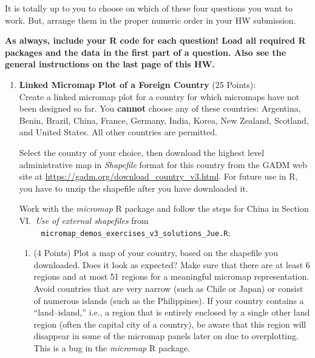 \documentclass[12pt,letterpaper,final]{article}
\begin{document}
It is totally up to you to choose on which of these four questions
you want to work. But, arrange them in the proper numeric order in your HW submission.

{\bf As always, include your R code for each question! 
Load all required R packages and the data in the first part of a question.
Also see the general instructions on the last page of this HW.}


\begin{enumerate}

\item {\bf Linked Micromap Plot of a Foreign Country} (25 Points): \\
Create a linked micromap plot for a country for
which micromaps have not been designed so far.
You {\bf cannot} choose any of these countries: 
Argentina, 
Benin, 
Brazil,
China,
France,
Germany,
India,
Korea,
New Zealand,
Scotland, and
United States.
All other countries are permitted.

Select the country of your choice, then download the highest level administrative map
in {\it Shapefile} format for this country from the GADM web site at
\url{https://gadm.org/download_country_v3.html}.
For future use in R, you have to unzip the shapefile after you have 
downloaded it.

Work with the {\it micromap} R package and
follow the steps for China in Section VI.\ {\it Use of external shapefiles} from \\
\verb|     micromap_demos_exercises_v3_solutions_Jue.R|:

\begin{enumerate}

\item (4 Points)
Plot a map of your country, based on the shapefile you downloaded. Does it look as expected?
Make sure that there are at least 6 regions and at most 51 regions for a meaningful
micromap representation. Avoid countries that are very narrow (such as Chile or Japan)
or consist of numerous islands (such as the Philippines). If your country
contains a ``land--island,'' i.e., a region that is entirely enclosed by a single
other land region (often the capital city of a country), be aware that this region
will disappear in some of the micromap panels later on due to overplotting.
This is a bug in the {\it micromap} R package.


\end{enumerate}
\end{enumerate}
\end{document}
